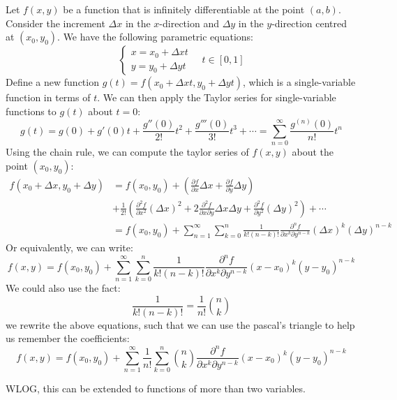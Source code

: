 \documentclass[11pt]{report}
\begin{document}
\begin{definition}
    Let $f(x,y)$ be a function that is infinitely differentiable at the point $(a,b)$. Consider the increment $\Delta x$ in the $x$-direction and $\Delta y$ in the $y$-direction centred at $(x_0,y_0)$. We have the following parametric equations:
    $$
        \begin{cases}
            x = x_0 + \Delta x t \\
            y = y_0 + \Delta y t
        \end{cases} \quad t \in [0,1]
    $$
    Define a new function $g(t) = f(x_0 + \Delta x t, y_0 + \Delta y t)$, which is a single-variable function in terms of $t$. We can then apply the Taylor series for single-variable functions to $g(t)$ about $t = 0$:
    $$
        g(t) = g(0) + g'(0)t + \frac{g''(0)}{2!}t^2 + \frac{g'''(0)}{3!}t^3 + \cdots = \sum_{n=0}^{\infty} \frac{g^{(n)}(0)}{n!} t^n
    $$
    Using the chain rule, we can compute the taylor series of $f(x,y)$ about the point $(x_0,y_0)$:
    \begin{align}
        f(x_0 + \Delta x, y_0 + \Delta y) &= f(x_0,y_0) + \left( \frac{\partial f}{\partial x} \Delta x + \frac{\partial f}{\partial y} \Delta y \right) \nonumber \\
        & + \frac{1}{2!} \left( \frac{\partial^2 f}{\partial x^2} (\Delta x)^2 + 2\frac{\partial^2 f}{\partial x \partial y} \Delta x \Delta y + \frac{\partial^2 f}{\partial y^2} (\Delta y)^2 \right) + \cdots \\
        &= f(x_0,y_0) + \sum_{n=1}^{\infty} \sum_{k=0}^n \frac{1}{k!(n-k)!} \frac{\partial^n f}{\partial x^k \partial y^{n-k}} (\Delta x)^k (\Delta y)^{n-k}
    \end{align}
    Or equivalently, we can write:
    \begin{equation}
        f(x,y) = f(x_0,y_0) + \sum_{n=1}^{\infty} \sum_{k=0}^n \frac{1}{k!(n-k)!} \frac{\partial^n f}{\partial x^k \partial y^{n-k}} (x - x_0)^k (y - y_0)^{n-k}
    \end{equation}
    We could also use the fact:
    $$
        \frac{1}{k!(n-k)!} = \frac{1}{n!} \binom{n}{k}
    $$
    we rewrite the above equations, such that we can use the pascal's triangle to help us remember the coefficients:
    \begin{equation}
        f(x,y) = f(x_0,y_0) + \sum_{n=1}^{\infty} \frac{1}{n!} \sum_{k=0}^n \binom{n}{k} \frac{\partial^n f}{\partial x^k \partial y^{n-k}} (x - x_0)^k (y - y_0)^{n-k}
    \end{equation}

    WLOG, this can be extended to functions of more than two variables.
\end{definition}
\end{document}
